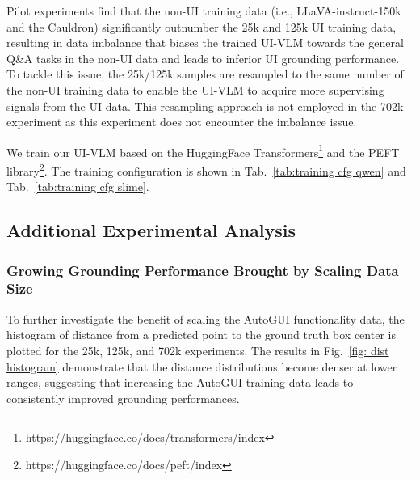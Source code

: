 Pilot experiments find that the non-UI training data (i.e., LLaVA-instruct-150k and the Cauldron) significantly outnumber the 25k and 125k UI training data, resulting in data imbalance that biases the trained UI-VLM towards the general Q\&A tasks in the non-UI data and leads to inferior UI grounding performance. To tackle this issue, the 25k/125k samples are resampled to the same number of the non-UI training data to enable the UI-VLM to acquire more supervising signals from the UI data. This resampling approach is not employed in the 702k experiment as this experiment does not encounter the imbalance issue.




We train our UI-VLM based on the HuggingFace Transformers\footnote{https://huggingface.co/docs/transformers/index} and the PEFT library\footnote{https://huggingface.co/docs/peft/index}. The training configuration is shown in Tab.~\ref{tab:training cfg qwen} and Tab.~\ref{tab:training cfg slime}.

\subsection{Additional Experimental Analysis}
\subsubsection{Growing Grounding Performance Brought by Scaling Data Size}

To further investigate the benefit of scaling the AutoGUI functionality data, the histogram of distance from a predicted point to the ground truth box center is plotted for the 25k, 125k, and 702k experiments. The results in Fig.~\ref{fig: dist histogram} demonstrate that the distance distributions become denser at lower ranges, suggesting that increasing the AutoGUI training data leads to consistently improved grounding performances.


